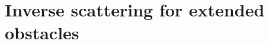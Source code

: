 \documentclass[final]{siamltex}
\begin{document}
%
%


\section{Inverse scattering for extended obstacles} \label{section obstacle}
\end{document}
